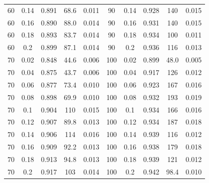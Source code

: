 \documentclass[12pt]{article}
\begin{document}
\begin{spacing}{2.0}
\begin{table}[h!]
\begin{tabular}{c c | c | c c ||c c | c | c c |}
                60&0.14&0.891&68.6&0.011	&	90&0.14&0.928&140&0.015\\
                60&0.16&0.890&88.0&0.014	&	90&0.16&0.931&140&0.015\\
                60&0.18&0.893&83.7&0.014	&	90&0.18&0.934&100&0.011\\
                60&0.2&0.899&87.1&0.014	&	90&0.2&0.936&116&0.013\\
                70&0.02&0.848&44.6&0.006	&	100&0.02&0.899&48.0&0.005\\
                70&0.04&0.875&43.7&0.006	&	100&0.04&0.917&126&0.012\\
                70&0.06&0.877&73.4&0.010	&	100&0.06&0.923&167&0.016\\
                70&0.08&0.898&69.9&0.010	&	100&0.08&0.932&193&0.019\\
                70&0.1&0.904&110&0.015	&	100&0.1&0.934&166&0.016\\
                70&0.12&0.907&89.8&0.013	&	100&0.12&0.934&187&0.018\\
                70&0.14&0.906&114&0.016	&	100&0.14&0.939&116&0.012\\
                70&0.16&0.909&92.2&0.013	&	100&0.16&0.938&179&0.018\\
                70&0.18&0.913&94.8&0.013	&	100&0.18&0.939&121&0.012\\
                70&0.2&0.917&103&0.014	&	100&0.2&0.942&98.4&0.010\\
				\hline
			\end{tabular}
			\end{table}


\end{spacing}
\end{document}
